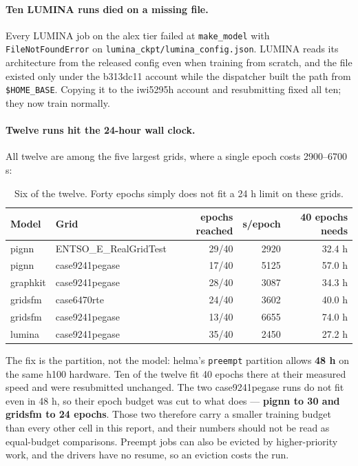 \documentclass[10pt]{article}
\begin{document}
\paragraph{Ten LUMINA runs died on a missing file.} Every LUMINA job on the alex
tier failed at \texttt{make\_model} with \texttt{FileNotFoundError} on
\texttt{lumina\_ckpt/lumina\_config.json}. LUMINA reads its architecture from
the released config even when training from scratch, and the file existed only
under the b313dc11 account while the dispatcher built the path from
\texttt{\$HOME\_BASE}. Copying it to the iwi5295h account and resubmitting fixed
all ten; they now train normally.

\paragraph{Twelve runs hit the 24-hour wall clock.} All twelve are among the
five largest grids, where a single epoch costs 2900--6700 s:

\begin{table}[H]
\centering\small
\begin{tabular}{llrrr}
\toprule
Model & Grid & epochs reached & s/epoch & 40 epochs needs \\
\midrule
pignn    & ENTSO\_E\_RealGridTest & 29/40 & 2920 & 32.4 h \\
pignn    & case9241pegase        & 17/40 & 5125 & 57.0 h \\
graphkit & case9241pegase        & 28/40 & 3087 & 34.3 h \\
gridsfm  & case6470rte           & 24/40 & 3602 & 40.0 h \\
gridsfm  & case9241pegase        & 13/40 & 6655 & 74.0 h \\
lumina   & case9241pegase        & 35/40 & 2450 & 27.2 h \\
\bottomrule
\end{tabular}
\caption{Six of the twelve. Forty epochs simply does not fit a 24 h limit on
these grids.}
\end{table}

The fix is the partition, not the model: helma's \texttt{preempt} partition
allows \textbf{48 h} on the same h100 hardware. Ten of the twelve fit 40 epochs
there at their measured speed and were resubmitted unchanged. The two
case9241pegase runs do not fit even in 48 h, so their epoch budget was cut to
what does --- \textbf{pignn to 30 and gridsfm to 24 epochs}. Those two therefore
carry a smaller training budget than every other cell in this report, and their
numbers should not be read as equal-budget comparisons. Preempt jobs can also be
evicted by higher-priority work, and the drivers have no resume, so an eviction
costs the run.
\end{document}
